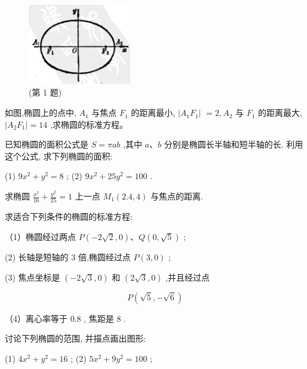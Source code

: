 \documentclass[lang=cn,newtx,10pt,scheme=chinese]{elegantbook}
\begin{document}
\begin{problemset}[习 题 六]

\item \begin{figure}[h]
  \centering
  \includegraphics[max width=0.4\textwidth]{images/01912cc2-ffb6-728e-9ae7-b113ff05c64b_94_706053.jpg}
  \caption{(第 1 题)}
\end{figure}



\item 如图,椭圆上的点中, \({A}_{1}\) 与焦点 \({F}_{1}\) 的距离最小, \(\left| {{A}_{1}{F}_{1}}\right|\) \(= 2,{A}_{2}\) 与 \({F}_{1}\) 的距离最大, \(\left| {{A}_{2}{F}_{1}}\right| = {14}\) ,求椭圆的标准方程。

\item 已知椭圆的面积公式是 \(S = {\pi ab}\) ,其中 \(a\text{、}b\) 分别是椭圆长半轴和短半轴的长. 利用这个公式, 求下列椭圆的面积:

(1) \(9{x}^{2} + {y}^{2} = 8\) ; (2) \(9{x}^{2} + {25}{y}^{2} = {100}\) .

\item 求椭圆 \(\frac{{x}^{2}}{16} + \frac{{y}^{2}}{25} = 1\) 上一点 \({M}_{1}\left( {{2.4},4}\right)\) 与焦点的距离.

\item 求适合下列条件的椭圆的标准方程:

（1）椭圆经过两点 \(P\left( {-2\sqrt{2},0}\right) \text{、}Q\left( {0,\sqrt{5}}\right)\) ;

(2) 长轴是短轴的 3 倍,椭圆经过点 \(P\left( {3,0}\right)\) ;

(3) 焦点坐标是 \(\left( {-2\sqrt{3},0}\right)\) 和 \(\left( {2\sqrt{3},0}\right)\) ,并且经过点

\[
  P\left( {\sqrt{5}, - \sqrt{6}}\right)
\]

（4）离心率等于 0.8 , 焦距是 8 .

\item 讨论下列椭圆的范围, 并描点画出图形:

(1) \(4{x}^{2} + {y}^{2} = {16}\) ; (2) \(5{x}^{2} + 9{y}^{2} = {100}\) ;


\end{problemset}
\end{document}
